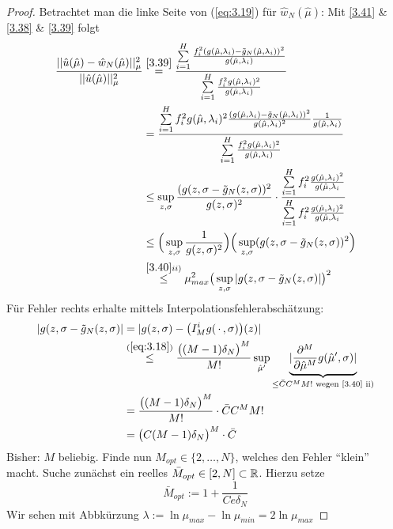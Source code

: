 \begin{proof}
Betrachtet man die linke Seite von (\ref{eq:3.19}) für $\hat{w}_N (\hat{\mu})$: Mit \ref{3.41} \& \ref{3.38} \& \ref{3.39} folgt
\begin{align}
	\frac{||\hat{u}(\hat{\mu}) - \hat{w}_N (\hat{\mu}) ||_{\mu}^2}{|| \hat{u}(\hat{\mu}) ||_{\mu}^2} &\overset{\ref{3.39}}{=} \frac{\sum\limits_{i=1}^H \frac{f_i^2 (g(\hat{\mu},\lambda_i) - \tilde{g}_N (\hat{\mu},\lambda_i))^2}{g(\hat{\mu},\lambda_i)}}{\sum\limits_{i=1}^H \frac{f_i^2 g(\hat{\mu},\lambda_i)^2}{g(\hat{\mu},\lambda_i)}} \notag \\ 
	&= \frac{\sum\limits_{i=1}^H f_i^2 g(\hat{\mu},\lambda_i)^2 \frac{(g(\hat{\mu},\lambda_i) - \tilde{g}_N (\hat{\mu},\lambda_i))^2}{g(\hat{\mu},\lambda_i)^2} \frac{1}{g(\hat{\mu},\lambda_i)}}{\sum\limits_{i=1}^H \frac{f_i^2 g(\hat{\mu},\lambda_i)^2}{g(\hat{\mu},\lambda_i)}} \notag \\
	&\leq \sup_{z,\sigma} \frac{(g(z,\sigma - \tilde{g}_N(z,\sigma))^2}{g(z,\sigma)^2} \cdot \frac{\sum\limits_{i=1}^H f_i^2 \frac{g(\hat{\mu},\lambda_i)^2}{g(\hat{\mu},\lambda_i}}{\sum\limits_{i=1}^H f_i^2 \frac{g(\hat{\mu},\lambda_i)^2}{g(\hat{\mu},\lambda_i}} \notag \\
	&\leq \Big( \sup_{z,\sigma} \frac{1}{g(z,\sigma)^2} \Big) \Big( \sup_{z,\sigma} (g(z,\sigma - \tilde{g}_N(z,\sigma))^2 \Big) \notag \\
	&\overset{\ref{3.40} ii)}{\leq} \mu_{max}^2 \big( \sup_{z,\sigma} |g(z,\sigma - \tilde{g}_N(z,\sigma)| \big)^2
	\label{eq:3.20}
\end{align}
Für Fehler rechts erhalte mittels Interpolationsfehlerabschätzung:
\begin{align}
	|g(z,\sigma - \tilde{g}_N(z,\sigma)| &= | g(z,\sigma) - \big(I_M^i g(\,\cdot\,, \sigma) \big) (z)| \notag \\
	& \overset{(\ref{eq:3.18})}{\leq} \frac{\big((M-1)\delta_N \big) ^M}{M!} \sup_{\hat{\mu}'} \underbrace{| \frac{\partial^M}{\partial \hat{\mu}^M} g(\hat{\mu}', \sigma) |}_{\leq \bar{C}C^M M! \text{ wegen \ref{3.40} ii)}} \notag \\
	&= \frac{\big((M-1)\delta_N \big) ^M}{M!} \cdot \bar{C}C^M M! \notag \\
	&= \big( C(M-1)\delta_N \big)^M \cdot \bar{C}
	\label{eq:3.21}
\end{align}
Bisher: $M$ beliebig. Finde nun $M_{opt} \in \{2,\dots,N\}$, welches den Fehler ``klein'' macht. Suche zunächst ein reelles $\bar{M}_{opt} \in [2,N] \subset \mathbb{R}$. Hierzu setze
\[
	\bar{M}_{opt} := 1+ \frac{1}{C e \delta_N}
\]
Wir sehen mit Abbkürzung $\lambda := \ln \mu_{max} - \ln \mu_{min} = 2 \ln \mu_{max}$

\end{proof}
